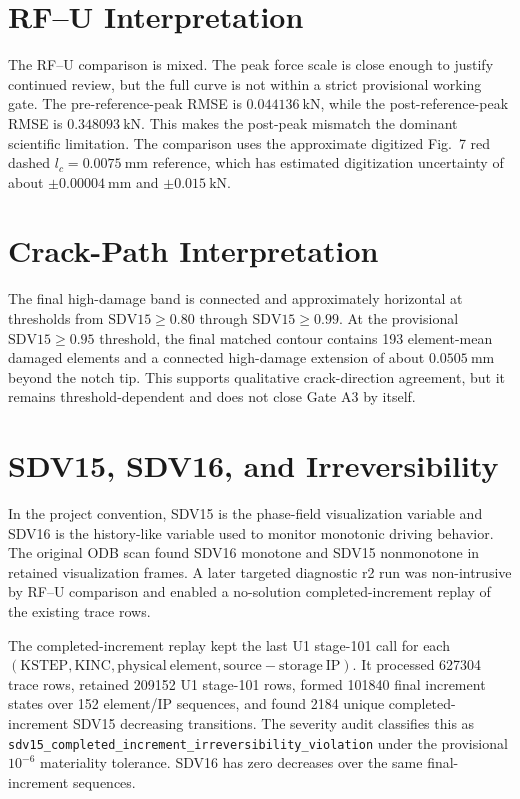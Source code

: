 \section{RF--U Interpretation}

The RF--U comparison is mixed. The peak force scale is close enough to justify
continued review, but the full curve is not within a strict provisional
working gate. The pre-reference-peak RMSE is \(0.044136~\mathrm{kN}\), while
the post-reference-peak RMSE is \(0.348093~\mathrm{kN}\). This makes the
post-peak mismatch the dominant scientific limitation. The comparison uses the
approximate digitized Fig.~7 red dashed \(l_c=0.0075~\mathrm{mm}\) reference,
which has estimated digitization uncertainty of about
\(\pm0.00004~\mathrm{mm}\) and \(\pm0.015~\mathrm{kN}\).

\section{Crack-Path Interpretation}

The final high-damage band is connected and approximately horizontal at
thresholds from \(\mathrm{SDV15}\ge0.80\) through
\(\mathrm{SDV15}\ge0.99\). At the provisional
\(\mathrm{SDV15}\ge0.95\) threshold, the final matched contour contains
193 element-mean damaged elements and a connected high-damage extension of
about \(0.0505~\mathrm{mm}\) beyond the notch tip. This supports qualitative
crack-direction agreement, but it remains threshold-dependent and does not
close Gate A3 by itself.

\section{SDV15, SDV16, and Irreversibility}

In the project convention, SDV15 is the phase-field visualization variable and
SDV16 is the history-like variable used to monitor monotonic driving behavior.
The original ODB scan found SDV16 monotone and SDV15 nonmonotone in retained
visualization frames. A later targeted diagnostic r2 run was non-intrusive by
RF--U comparison and enabled a no-solution completed-increment replay of the
existing trace rows.

The completed-increment replay kept the last U1 stage-101 call for each
\((\mathrm{KSTEP}, \mathrm{KINC}, \mathrm{physical~element},
\mathrm{source-storage~IP})\). It processed 627304 trace rows, retained
209152 U1 stage-101 rows, formed 101840 final increment states over 152
element/IP sequences, and found 2184 unique completed-increment SDV15
decreasing transitions. The severity audit classifies this as
\texttt{sdv15\_completed\_increment\_irreversibility\_violation} under the
provisional \(10^{-6}\) materiality tolerance. SDV16 has zero decreases over
the same final-increment sequences.

